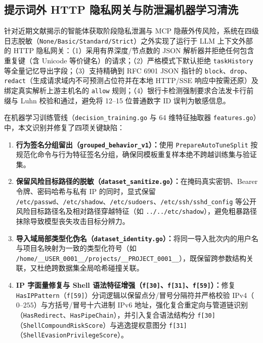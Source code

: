 \documentclass[UTF8,a4paper,zihao=-4,twocolumn]{ctexart}
\newcommand{\code}[1]{\texttt{\small #1}}
\begin{document}
\subsection{提示词外 HTTP 隐私网关与防泄漏机器学习清洗}
针对近期文献揭示的智能体获取阶段隐私泄漏与 MCP 隐蔽外传风险\cite{flowseal2026,minim2026,sope2026,privacypeek2026}，系统在四级日志脱敏（\code{None/Basic/Standard/Strict}）之外实现了运行于 LLM 上下文外部的 HTTP 隐私网关：（1）采用有界深度/节点数的 JSON 解析器并拒绝任何包含重复键（含 Unicode 等价键名）的请求；（2）严格模式下默认拒绝 \code{taskHistory} 等全量记忆导出字段；（3）支持精确到 RFC 6901 JSON 指针的 \code{block}、\code{drop}、\code{redact}（生成请求域内不可预测占位符并在本地 HTTP/SSE 响应中按需还原）及绑定真实解析上游主机名的 \code{allow} 规则；（4）银行卡检测强制要求合法发卡行前缀与 Luhn 校验和通过，避免将 12--15 位普通数字 ID 误判为敏感信息。

在机器学习训练管线（\code{decision\_training.go} 与 64 维特征抽取器 \code{features.go}）中，本文识别并修复了四项关键缺陷：
\begin{enumerate}
  \item \textbf{行为签名分组留出（\code{grouped\_behavior\_v1}）：}使用 \code{PrepareAutoTuneSplit} 按规范化命令与行为特征签名分组，确保同模板重复样本绝不跨越训练集与验证集。
  \item \textbf{保留风险目标路径的脱敏（\code{dataset\_sanitize.go}）：}在掩码真实密钥、Bearer 令牌、密码哈希与私有 IP 的同时，显式保留 \code{/etc/passwd}、\code{/etc/shadow}、\code{/etc/sudoers}、\code{/etc/ssh/sshd\_config} 等公开风险目标路径名及相对路径穿越特征（如 \code{../../etc/shadow}），避免粗暴路径抹除导致模型丧失攻击目标分辨力。
  \item \textbf{导入域局部类型化伪名（\code{dataset\_identity.go}）：}将同一导入批次内的用户名与项目名映射为一致的类型化符号（如 \code{/home/\_\_USER\_0001\_\_/projects/\_\_PROJECT\_0001\_\_}），既保留跨参数结构关联，又杜绝跨数据集全局哈希碰撞关联。
  \item \textbf{IP 字面量修复与 Shell 语法特征增强（\code{f[30]}、\code{f[31]}、\code{f[59]}）：}修复 \code{HasIPPattern}（\code{f[59]}）分词逻辑以保留点分/冒号分隔符并严格校验 IPv4（$0\text{--}255$）与方括号/冒号十六进制 IPv6 地址，强化复合重定向与管道链识别（\code{HasRedirect}、\code{HasPipeChain}），并引入复合语法结构分 \code{f[30]}（\code{ShellCompoundRiskScore}）与逃逸提权意图分 \code{f[31]}（\code{ShellEvasionPrivilegeScore}）。
\end{enumerate}

\end{document}
